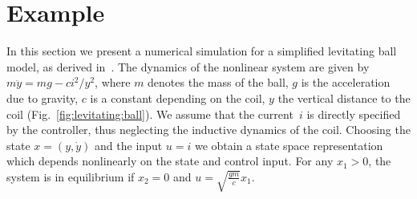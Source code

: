 \section{Example}\label{sec:example}
In this section we present a numerical simulation for a simplified levitating ball model, as derived in~\cite{Schaich:2015}. The dynamics of the nonlinear system are given by $m\ddot y = m g - c i^2/y^2$,
where $m$ denotes the mass of the ball, $g$ is the acceleration due to gravity, $c$ is a constant depending
on the coil, $y$ the vertical distance to the coil (Fig.~\ref{fig:levitating:ball}). We assume that the current~$i$ is directly specified by the controller, thus neglecting the inductive dynamics of the coil. %
Choosing the state $x=(y,\dot y)$ and the input $u=i$ we obtain a state space representation which depends nonlinearly
on the state and control input. For any $x_1>0$, the system is in equilibrium if $x_2=0$ and $u=\sqrt{\frac{gm}{c}}x_1$.


